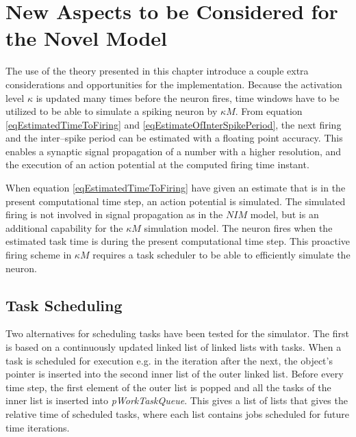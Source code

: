 	\section{New Aspects to be Considered for the Novel Model}
		The use of the theory presented in this chapter introduce a couple extra considerations and opportunities for the implementation.
		Because the activation level $\kappa$ is updated many times before the neuron fires, time windows have to be utilized to be able to simulate a spiking neuron by $\kappa M$.
		From equation \ref{eqEstimatedTimeToFiring} and \ref{eqEstimateOfInterSpikePeriod}, the next firing and the inter--spike period can be estimated with a floating point accuracy.
		This enables a synaptic signal propagation of a number with a higher resolution, and the execution of an action potential at the computed firing time instant.
		
		When equation \ref{eqEstimatedTimeToFiring} have given an estimate that is in the present computational time step, an action potential is simulated.
		The simulated firing is not involved in signal propagation as in the $NIM$ model, but is an additional capability for the $\kappa M$ simulation model.
		The neuron fires when the estimated task time is during the present computational time step.
		This proactive firing scheme in $\kappa M$ requires a task scheduler to be able to efficiently simulate the neuron.
		
		

		\subsection{Task Scheduling}
			
			Two alternatives for scheduling tasks have been tested for the simulator.
			The first is based on a continuously updated linked list of linked lists with tasks. %
			When a task is scheduled for execution e.g. in the iteration after the next, the object's pointer is inserted into the second inner list of the outer linked list.
			Before every time step, the first element of the outer list is popped and all the tasks of the inner list is inserted into \emph{pWorkTaskQueue}.
			This gives a list of lists that gives the relative time of scheduled tasks, where each list contains jobs scheduled for future time iterations.
			
